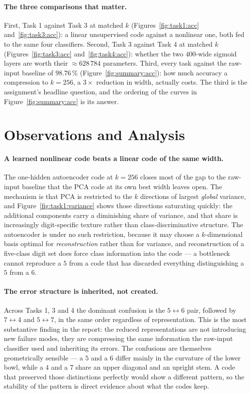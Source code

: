 \documentclass[11pt,a4paper]{article}
\begin{document}
\paragraph{The three comparisons that matter.}
First, Task 1 against Task 3 at matched $k$ (Figures~\ref{fig:task1:acc} and~\ref{fig:task3:acc}):
a linear unsupervised code against a nonlinear one, both fed to the same four classifiers.  Second,
Task 3 against Task 4 at matched $k$ (Figures~\ref{fig:task3:acc} and~\ref{fig:task4:acc}): whether
the two $400$-wide sigmoid layers are worth their $\approx628\,784$ parameters.  Third, every task
against the raw-input baseline of $98.76\,\%$ (Figure~\ref{fig:summary:acc}): how much accuracy a
compression to $k=256$, a $3\times$ reduction in width, actually costs.  The third is the
assignment's headline question, and the ordering of the curves in Figure~\ref{fig:summary:acc} is
its answer.

\section{Observations and Analysis}\label{sec:obs}
\paragraph{A learned nonlinear code beats a linear code of the same width.}
The one-hidden autoencoder code at $k=256$ closes most of the gap to the raw-input baseline that the
PCA code at its own best width leaves open.  The mechanism is that PCA is restricted to the $k$
directions of largest \emph{global} variance, and Figure~\ref{fig:task1:variance} shows those
directions saturating quickly: the additional components carry a diminishing share of variance, and
that share is increasingly digit-specific texture rather than class-discriminative structure.  The
autoencoder is under no such restriction, because it may choose a $k$-dimensional basis optimal for
\emph{reconstruction} rather than for variance, and reconstruction of a five-class digit set does
force class information into the code --- a bottleneck cannot reproduce a $5$ from a code that has
discarded everything distinguishing a $5$ from a $6$.

\paragraph{The error structure is inherited, not created.}
Across Tasks 1, 3 and 4 the dominant confusion is the $5\leftrightarrow6$ pair, followed by
$7\leftrightarrow4$ and $5\leftrightarrow7$, in the same order regardless of representation.  This
is the most substantive finding in the report: the reduced representations are not introducing new
failure modes, they are compressing the same information the raw-input classifier used and
inheriting its errors.  The confusions are themselves geometrically sensible --- a $5$ and a $6$
differ mainly in the curvature of the lower bowl, while a $4$ and a $7$ share an upper diagonal and
an upright stem.  A code that preserved those distinctions perfectly would show a different pattern,
so the stability of the pattern is direct evidence about what the codes keep.
\end{document}

